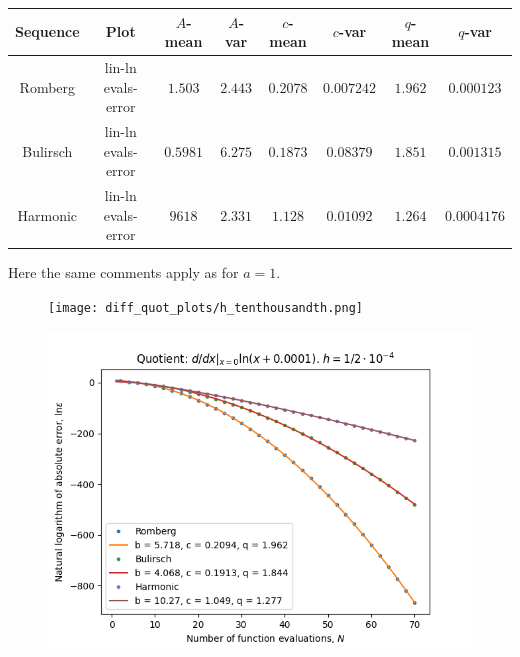 \begin{table}[H]
    \centering
    \small
    \begin{tabular}{c|c||c|c|c|c|c|c}
Sequence & Plot & \(A\)-mean & \(A\)-var & \(c\)-mean & \(c\)-var & \(q\)-mean & \(q\)-var\\\hline
Romberg & lin-ln evals-error & \(1.503\) & \(2.443\) & \(0.2078\) & \(0.007242\) & \(1.962\) & \(0.000123\) \\
Bulirsch & lin-ln evals-error & \(0.5981\) & \(6.275\) & \(0.1873\) & \(0.08379\) & \(1.851\) & \(0.001315\) \\
Harmonic & lin-ln evals-error & \(9618\) & \(2.331\) & \(1.128\) & \(0.01092\) & \(1.264\) & \(0.0004176\) \\
    \end{tabular}
    \label{tab:my_label}
\end{table}

Here the same comments apply as for \(a = 1\).

\begin{figure}[H]
\centering
\begin{minipage}{0.45\textwidth}
\centering
\texttt{[image: diff\_quot\_plots/h\_tenthousandth.png]}
\end{minipage}
\begin{minipage}{0.45\textwidth}
\centering
\includegraphics[scale=0.45]{diff_quot_plots/h_tenthousandth_hp_trend.png}
\end{minipage}
\end{figure}

